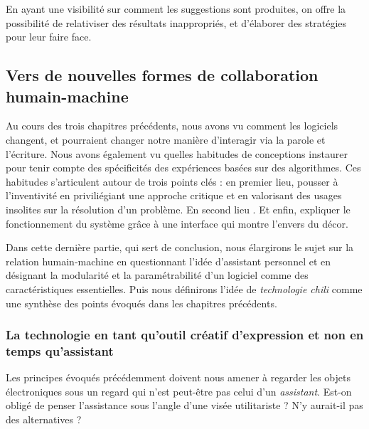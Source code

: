 \documentclass[]{article}
\begin{document}
En ayant une visibilité sur comment les suggestions sont produites, on
offre la possibilité de relativiser des résultats inappropriés, et
d'élaborer des stratégies pour leur faire face.

\newpage

\hypertarget{vers-de-nouvelles-formes-de-collaboration-humain-machine}{%
\subsection{Vers de nouvelles formes de collaboration
humain-machine}\label{vers-de-nouvelles-formes-de-collaboration-humain-machine}}

Au cours des trois chapitres précédents, nous avons vu comment les
logiciels changent, et pourraient changer notre manière d'interagir via
la parole et l'écriture. Nous avons également vu quelles habitudes de
conceptions instaurer pour tenir compte des spécificités des expériences
basées sur des algorithmes. Ces habitudes s'articulent autour de trois
points clés : en premier lieu, pousser à l'inventivité en priviliégiant
une approche critique et en valorisant des usages insolites sur la
résolution d'un problème. En second lieu . Et enfin, expliquer le
fonctionnement du système grâce à une interface qui montre l'envers du
décor.

Dans cette dernière partie, qui sert de conclusion, nous élargirons le
sujet sur la relation humain-machine en questionnant l'idée d'assistant
personnel et en désignant la modularité et la paramétrabilité d'un
logiciel comme des caractéristiques essentielles. Puis nous définirons
l'idée de \emph{technologie chili} comme une synthèse des points évoqués
dans les chapitres précédents.

\hypertarget{la-technologie-en-tant-quoutil-cruxe9atif-dexpression-et-non-en-temps-quassistant}{%
\subsubsection{La technologie en tant qu'outil créatif d'expression et
non en temps
qu'assistant}\label{la-technologie-en-tant-quoutil-cruxe9atif-dexpression-et-non-en-temps-quassistant}}

Les principes évoqués précédemment doivent nous amener à regarder les
objets électroniques sous un regard qui n'est peut-être pas celui d'un
\emph{assistant}. Est-on obligé de penser l'assistance sous l'angle
d'une visée utilitariste ? N'y aurait-il pas des alternatives ?
\end{document}
